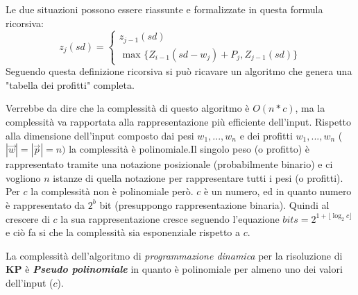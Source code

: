 \documentclass[a4paper]{article}
\newcommand{\imp}[1]{\textbf{\textit{#1}}}
\begin{document}
Le due situazioni possono essere riassunte e formalizzate in questa formula ricorsiva:
\begin{equation*}
	z_j(sd)= \begin{cases} z_{j-1}(sd)\\ 
	\text{ max } \{ Z_{i-1}(sd - w_j) + P_j , Z_{j-1}(sd) \}
\end{cases}
\end{equation*}
Seguendo questa definizione ricorsiva si può ricavare un algoritmo che genera una "tabella dei profitti" completa.

Verrebbe da dire che la complessità di questo algoritmo è $O(n*c)$, ma la complessità va rapportata alla rappresentazione più efficiente dell'input.
Rispetto alla dimensione dell'input composto dai pesi $w_1, ..., w_n$ e dei profitti $w_1, ... , w_n$ ($| \vec w | = | \vec p | = n)$ la complessità è polinomiale.Il singolo peso (o profitto) è rappresentato tramite una notazione posizionale (probabilmente binario) e ci vogliono $n$ istanze di quella notazione per rappresentare tutti i pesi (o profitti).\\
Per $c$ la complessità non è polinomiale però. $c$ è un numero, ed in quanto numero è rappresentato da $2^b$ bit (presuppongo rappresentazione binaria).
Quindi al crescere di $c$ la sua rappresentazione cresce seguendo l'equazione $bits = 2^{1 + \lfloor \log_2c \rfloor}$ e ciò fa si che la complessità sia esponenziale rispetto a $c$.

La complessità dell'algoritmo di \textit{programmazione dinamica} per la risoluzione di \textbf{KP} è \imp{Pseudo polinomiale} in quanto è polinomiale per almeno uno dei valori dell'input ($c$).
\end{document}
